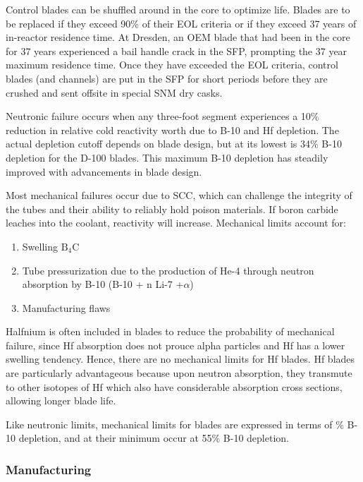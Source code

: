 \documentclass[10pt]{article}
\newcounter{subsubsubsection}[subsubsection]
\begin{document}
Control blades can be shuffled around in the core to optimize life. Blades are to be replaced if they exceed 90\% of their EOL criteria or if they exceed 37 years of in-reactor residence time. At Dresden, an OEM blade that had been in the core for 37 years experienced a bail handle crack in the SFP, prompting the 37 year maximum residence time. Once they have exceeded the EOL criteria, control blades (and channels) are put in the SFP for short periods before they are crushed and sent offsite in special SNM dry casks. 


Neutronic failure occurs when any three-foot segment experiences a 10\% reduction in relative cold reactivity worth due to B-10 and Hf depletion.  The actual depletion cutoff depends on blade design, but at its lowest is 34\% B-10 depletion for the D-100 blades. This maximum B-10 depletion has steadily improved with advancements in blade design. 


Most mechanical failures occur due to SCC, which can challenge the integrity of the tubes and their ability to reliably hold poison materials. If boron carbide leaches into the coolant, reactivity will increase. Mechanical limits account for:

\begin{enumerate}
\item Swelling \(\textrm{B}_4\)C
\item Tube pressurization due to the production of He-4 through neutron absorption by B-10 (B-10 + n  Li-7 +\(\alpha\))
\item Manufacturing flaws
\end{enumerate}

Halfnium is often included in blades to reduce the probability of mechanical failure, since Hf absorption does not prouce alpha particles and Hf has a lower swelling tendency. Hence, there are no mechanical limits for Hf blades. Hf blades are particularly advantageous because upon neutron absorption, they transmute to other isotopes of Hf which also have considerable absorption cross sections, allowing longer blade life. 

Like neutronic limits, mechanical limits for blades are expressed in terms of \% B-10 depletion, and at their minimum occur at 55\% B-10 depletion. 

\subsubsection{Manufacturing}
\end{document}
